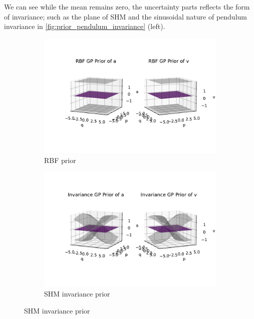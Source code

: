 \documentclass{statsmsc}
\begin{document}
We can see while the mean remains zero, the uncertainty parts reflects the form of invariance; such as the plane of SHM and the sinusoidal nature of pendulum invariance in \ref{fig:prior_pendulum_invariance} (left).

\begin{figure}[H]
     \centering
     \begin{subfigure}[b]{0.8\linewidth}
        \centering
        \includegraphics[width=\linewidth]{../codes/figures/prior_shm_rbf.pdf}
        \caption{RBF prior}
        \label{fig:prior_shm_rbf}
     \end{subfigure}
     \hfill
     \begin{subfigure}[b]{0.8\linewidth}
         \centering
         \includegraphics[width=\linewidth]{../codes/figures/prior_shm_invariance.pdf}
         \caption{SHM invariance prior}
         \label{fig:prior_shm_invariance}
     \end{subfigure}

\end{figure}
\end{document}
